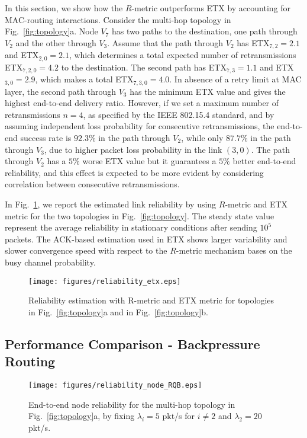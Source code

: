 \documentclass[review, 1p, 11pt]{elsarticle}
\numberwithin{equation}{section}
\begin{document}
In this section, we show how the $R$-metric outperforms ETX by accounting for MAC-routing interactions.
Consider the multi-hop topology in Fig.~\ref{fig:topology}a. Node $V_7$ has two paths to the destination, one path through $V_2$ and the other through $V_3$. Assume that the path through $V_2$ has ETX$_{7,2}=2.1$ and ETX$_{2,0}=2.1$, which determines a total expected number of retransmissions ETX$_{7,2,0}=4.2$ to the destination. The second path has ETX$_{7,3}=1.1$ and ETX$_{3,0}=2.9$, which makes a total ETX$_{7,3,0}=4.0$.
In absence of a retry limit at MAC layer, the second path through $V_3$ has the minimum ETX value and gives the highest end-to-end delivery ratio. However, if we set a maximum number of retransmissions $n=4$, as specified by the IEEE 802.15.4 standard, and by assuming independent loss probability for consecutive retransmissions, the end-to-end success rate is $92.3\%$ in the path through $V_2$, while only $87.7\%$ in the path through $V_3$, due to higher packet loss probability in the link $(3,0)$. The path through $V_2$ has a $5\%$ worse ETX value but it guarantees a $5\%$ better end-to-end reliability, and this effect is expected to be more evident by considering correlation between consecutive retransmissions.

In Fig.~\ref{fig:estimation}, we report the estimated link reliability by using $R$-metric  and ETX metric for the two topologies in Fig.~\ref{fig:topology}.
The steady state value represent the average reliability in stationary conditions after sending $10^5$ packets.
The ACK-based estimation used in ETX shows larger variability and slower convergence speed with respect to the $R$-metric mechanism bases on the busy channel probability.


\begin{figure}\centering
  \texttt{[image: figures/reliability\_etx.eps]}
  \caption{Reliability estimation with R-metric and ETX metric for topologies in Fig.~\ref{fig:topology}a and in Fig.~\ref{fig:topology}b.}\label{fig:estimation}
\end{figure}





\subsection{Performance Comparison - Backpressure Routing}



\begin{figure}[h] \centering
\texttt{[image: figures/reliability\_node\_RQB.eps]}
\caption{End-to-end node reliability for the multi-hop
topology in Fig.~\ref{fig:topology}a, by fixing $\lambda_i=5$ pkt/s for $i\neq2$ and $\lambda_2=20$ pkt/s.\label{fig:mh_rel_node}}
\end{figure}
\end{document}
